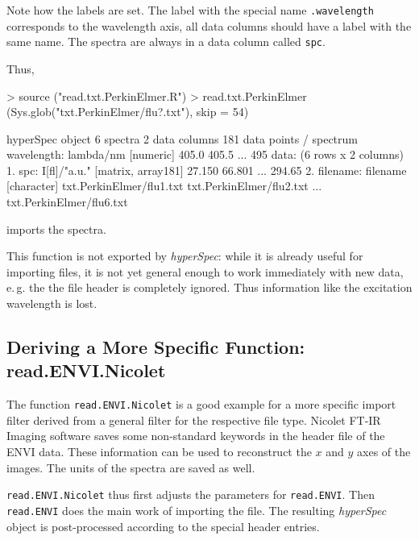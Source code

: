\documentclass[english, a4paper, 10pt, headings=small, DIV11]{scrartcl}
\renewenvironment{Schunk}{\vspace{0pt}\begin{small}}{\end{small}\vspace{0pt}}
\newcommand{\Rcode}[2][]{\texorpdfstring{\nohyphens{#1\texttt{#2}}}{#2}}
\newcommand{\Rfunction}[2][]{\texorpdfstring{\nohyphens{#1\texttt{#2}}}{#2}}
\newcommand{\Rclass}[1]{\texorpdfstring{\nohyphens{\textit{#1}}}{#1}}
\newcommand{\phy}{\texorpdfstring{\nohyphens{\textit{hyperSpec}}}{hyperSpec}\xspace}
\newcommand{\chy}{\Rclass{hyperSpec}\xspace}
\newcommand{\eg}{e.\,g.\xspace}
\begin{document}

Note how the labels are set. The label with the special name \Rcode{.wavelength} corresponds to the
wavelength axis, all data columns should have a label with the same name. The spectra are always in a
data column called \Rcode{spc}.

Thus,
\begin{Schunk}
\begin{Sinput}
> source ("read.txt.PerkinElmer.R")
> read.txt.PerkinElmer (Sys.glob("txt.PerkinElmer/flu?.txt"), skip = 54)
\end{Sinput}
\begin{Soutput}
hyperSpec object
   6 spectra
   2 data columns
   181 data points / spectrum
wavelength: lambda/nm [numeric] 405.0 405.5 ... 495 
data:  (6 rows x 2 columns)
   1. spc: I[fl]/"a.u." [matrix, array181] 27.150 66.801 ... 294.65 
   2. filename: filename [character] txt.PerkinElmer/flu1.txt txt.PerkinElmer/flu2.txt ... txt.PerkinElmer/flu6.txt 
\end{Soutput}
\end{Schunk}
imports the spectra.

This function is not exported by \phy: while it is already useful for importing files, it is not yet
general enough to work immediately with new data, \eg the the file header is completely ignored. Thus
information like the excitation wavelength is lost.

\subsection{Deriving a More Specific Function: read.ENVI.Nicolet}
The function \Rfunction{read.ENVI.Nicolet} is a good example for a more specific import filter
derived from a general filter for the respective file type.
Nicolet FT-IR Imaging software saves some non-standard keywords in the header file of the ENVI data.
These information can be used to reconstruct the $x$ and $y$ axes of the images. The units of the
spectra are saved as well.

\Rfunction{read.ENVI.Nicolet} thus first adjusts the parameters for \Rfunction{read.ENVI}. Then
\Rfunction{read.ENVI} does the main work of importing the file. The resulting \chy object is
post-processed according to the special header entries.
\end{document}
